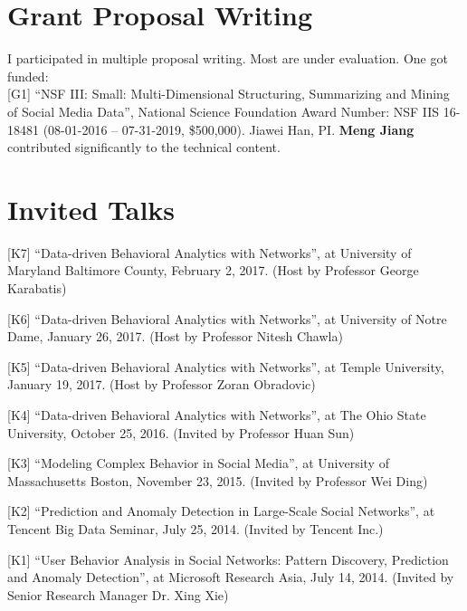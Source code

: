 \documentclass[margin, 10pt]{res}
\begin{document}
\begin{resume}
\section{Grant Proposal Writing}

{I participated in multiple proposal writing. Most are under evaluation. One got funded:} \\
{[G1]} ``NSF III: Small: Multi-Dimensional Structuring, Summarizing and Mining of Social Media Data'', National Science Foundation Award Number: NSF IIS 16-18481 (08-01-2016 -- 07-31-2019, \$500,000). Jiawei Han, PI. \textbf{Meng Jiang} contributed significantly to the technical content.


\section{Invited Talks}

[K7] ``Data-driven Behavioral Analytics with Networks'', at University of Maryland Baltimore County, February 2, 2017. (Host by Professor George Karabatis)

[K6] ``Data-driven Behavioral Analytics with Networks'', at University of Notre Dame, January 26, 2017. (Host by Professor Nitesh Chawla)

[K5] ``Data-driven Behavioral Analytics with Networks'', at Temple University, January 19, 2017. (Host by Professor Zoran Obradovic)

[K4] ``Data-driven Behavioral Analytics with Networks'', at The Ohio State University, October 25, 2016. (Invited by Professor Huan Sun)

[K3] ``Modeling Complex Behavior in Social Media'', at University of Massachusetts Boston, November 23, 2015. (Invited by Professor Wei Ding)

[K2] ``Prediction and Anomaly Detection in Large-Scale Social Networks'', at Tencent Big Data Seminar, July 25, 2014. (Invited by Tencent Inc.)

[K1] ``User Behavior Analysis in Social Networks: Pattern Discovery, Prediction and Anomaly Detection'', at Microsoft Research Asia, July 14, 2014. (Invited by Senior Research Manager Dr. Xing Xie)



\end{resume}
\end{document}
